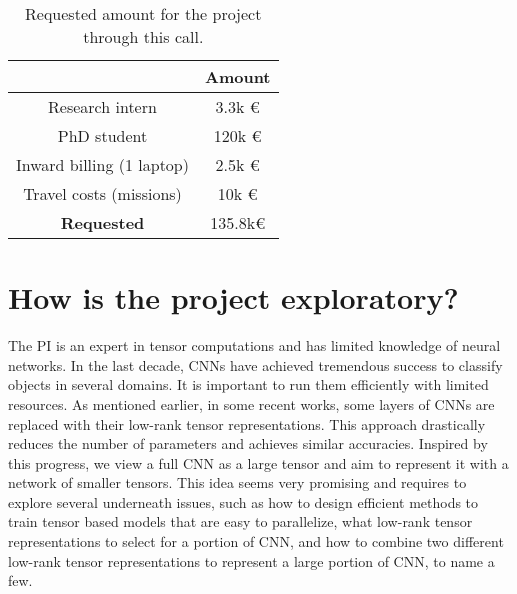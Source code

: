 \documentclass[11pt]{article}
\begin{document}
\begin{table}
	\begin{center}
\begin{tabular}{|c|c|}
\hline
& Amount\\ \hline
Research intern & 3.3k \euro \\ \hline
PhD student & 120k \euro \\ \hline
Inward billing (1 laptop) & 2.5k \euro \\ \hline
Travel costs (missions) & 10k \euro \\ \hline
\textbf{Requested} & 135.8k\euro\\ \hline
\end{tabular}
	\caption{Requested amount for the project through this call.\label{tab:reqcost}}
\end{center}
\end{table}











\section{How is the project exploratory?}

The PI is an expert in tensor computations and has limited knowledge of neural networks. In the last decade,  CNNs have achieved tremendous success to classify objects in several domains. It is important to run them efficiently with limited resources. As mentioned earlier, in some recent works, some layers of CNNs are replaced with their low-rank tensor representations. This approach drastically reduces the number of parameters and achieves similar accuracies. Inspired by this progress, we view a full CNN as a large tensor and aim to represent it with a network of smaller tensors. This idea seems very promising and requires to explore several underneath issues, such as how to design efficient methods to train tensor based models that are easy to parallelize, what low-rank tensor representations to select for a portion of CNN, and how to combine  two different low-rank tensor representations  to represent a large portion of CNN, to name a few.
\end{document}
